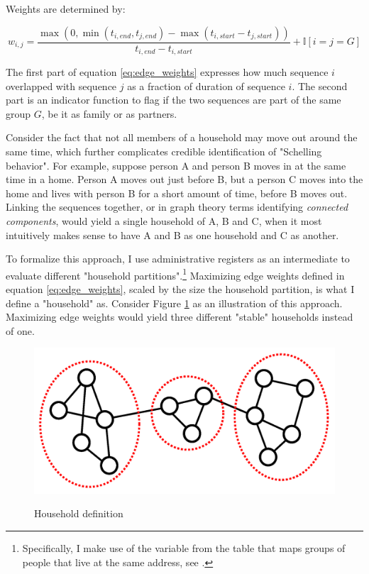 \documentclass[main.tex]{subfiles}
\begin{document}
Weights are determined by:

\begin{equation}
    w_{i, j} = \frac{\max(0 , \min(t_{i,end}, t_{j, end}) -\max(t_{i,start}-t_{j, start}))}{t_{i,end}-t_{i,start}} + \mathbb{I}[i=j=G]
    \label{eq:edge_weights}
\end{equation}

The first part of equation \ref{eq:edge_weights} expresses how much sequence $i$ overlapped with sequence $j$ as a fraction of duration of sequence $i$. The second part is an indicator function to flag if the two sequences are part of the same group $G$, be it as family or as partners.

Consider the fact that not all members of a household may move out around the same time, which further complicates credible identification of "Schelling behavior". For example, suppose person A and person B moves in at the same time in a home. Person A moves out just before B, but a person C moves into the home and lives with person B for a short amount of time, before B moves out. Linking the sequences together, or in graph theory terms identifying \textit{connected components}, would yield a single household of A, B and C, when it most intuitively makes sense to have A and B as one household and C as another. 

To formalize this approach, I use administrative registers as an intermediate to evaluate different "household partitions".\footnote{Specifically, I make use of the  variable from the  table that maps groups of people that live at the same address, see \textcite{dst_familie_id}.} Maximizing edge weights defined in equation \ref{eq:edge_weights}, scaled by the size the household partition, is what I define a "household" as. Consider Figure \ref{fig:temporal_community_detection} as an illustration of this approach. Maximizing edge weights would yield three different "stable" households instead of one.
\begin{figure}[H]
    \centering
    \caption{Household definition}
    \includegraphics[width=0.4\linewidth]{figs/temporal_community_detection.png}
    \label{fig:temporal_community_detection}
\end{figure}
\end{document}
